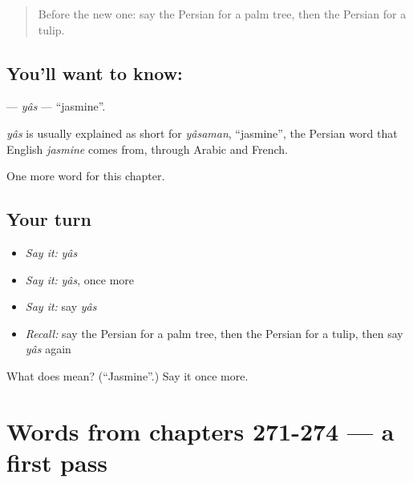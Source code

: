 \label{lesson:FA-C279-yas}



\begin{quote}
Before the new one: say the Persian for a palm tree, then the Persian for a tulip.
\end{quote}

\subsection*{You'll want to know: }
\textbf{} — \emph{yâs} — \textquotedblleft{}jasmine\textquotedblright{}.

\begin{cousinweb}
\emph{yâs} is usually explained as short for \emph{yâsaman}, \textquotedblleft{}jasmine\textquotedblright{}, the Persian word that English \emph{jasmine} comes from, through Arabic and French.
\end{cousinweb}

\begin{grammarlens}[title={What you've built}]
One more word for this chapter.
\end{grammarlens}

\subsection*{Your turn}
\begin{itemize}
\raggedright
  \item \emph{Say it:} \emph{yâs}
  \item \emph{Say it:} \emph{yâs}, once more
  \item \emph{Say it:} say \emph{yâs}
  \item \emph{Recall:} say the Persian for a palm tree, then the Persian for a tulip, then say \emph{yâs} again
\end{itemize}

\begin{tcolorbox}[breakable,colback=teal!4,colframe=teal!35!black,title={Before you move on}]
What does  mean? (\textquotedblleft{}Jasmine\textquotedblright{}.) Say it once more.
\end{tcolorbox}
\section[(dialogue)]{Words from chapters 271-274 — a first pass}

\label{lesson:FA-R279-first-pass-words-from-chapters-271-274}



